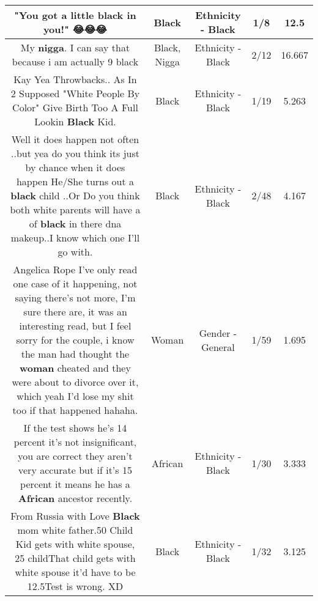 \documentclass[11pt]{article}
\newlength\mylength
\begin{document}
\begin{center}
\begin{longtable}{|C{.65\mylength}|C{.30\mylength}|C{.12\mylength}|C{.12\mylength}|C{.12\mylength}|}
  \small "You got a little \textbf{black} in you!" 😂😂😂\normalsize   & Black & Ethnicity - Black & 1/8 & 12.5 \\  \hline
  \small My \textbf{nigga}. I can say that because i am actually 9 black\normalsize   & Black, Nigga & Ethnicity - Black & 2/12 & 16.667 \\  \hline
  \small Kay Yea Throwbacks.. As In 2 Supposed "White People By Color" Give Birth Too A Full Lookin \textbf{Black} Kid.\normalsize   & Black & Ethnicity - Black & 1/19 & 5.263 \\  \hline
  \small Well it does happen not often ..but yea do you think its just by chance when it does happen He/She turns out a \textbf{black} child  ..Or Do you think both white parents  will have a  of \textbf{black} in there dna makeup..I know which one I'll go with.\normalsize   & Black & Ethnicity - Black & 2/48 & 4.167 \\  \hline
  \small Angelica Rope I've only read one case of it happening, not saying there's not more, I'm sure there are, it was an interesting read, but I feel sorry for the couple, i know the man had thought the \textbf{woman} cheated and they were about to divorce over it, which yeah I'd lose my shit too if that happened hahaha.\normalsize   & Woman & Gender - General & 1/59 & 1.695 \\  \hline
  \small If the test shows he's 14 percent it's not insignificant, you are correct they aren't very accurate but if it's 15 percent it means he has a \textbf{African} ancestor recently.\normalsize   & African & Ethnicity - Black & 1/30 & 3.333 \\  \hline
  \small From Russia with Love \textbf{Black} mom white father.50 Child Kid gets with white spouse, 25 childThat child gets with white spouse it'd have to be 12.5Test is wrong. XD\normalsize   & Black & Ethnicity - Black & 1/32 & 3.125 \\  \hline

\end{longtable}
\end{center}
\end{document}
